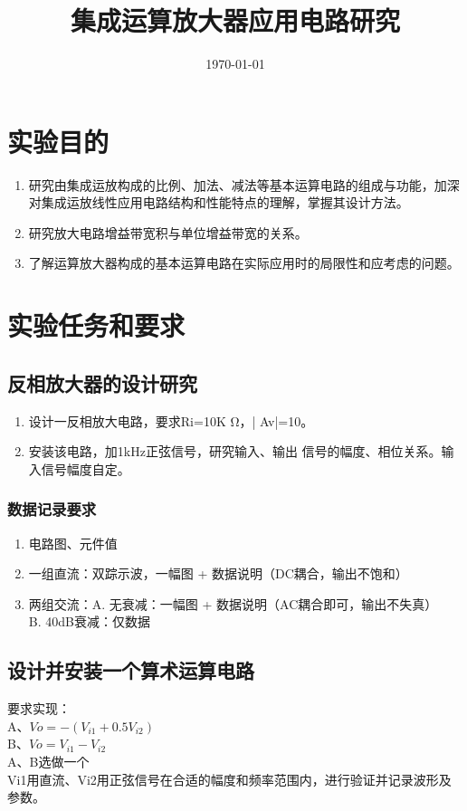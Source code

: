 \documentclass{../source/Experiment}
\title{集成运算放大器应用电路研究}
\date{\today}
\begin{document}
    \makecover
    \makeheader

    \section{实验目的}
        \begin{enumerate}
            \item 研究由集成运放构成的比例、加法、减法等基本运算电路的组成与功能，加深对集成运放线性应用电路结构和性能特点的理解，掌握其设计方法。
            \item 研究放大电路增益带宽积与单位增益带宽的关系。
            \item 了解运算放大器构成的基本运算电路在实际应用时的局限性和应考虑的问题。
        \end{enumerate}
    \section{实验任务和要求}
        \subsection{反相放大器的设计研究}
            \begin{enumerate}
                \item 设计一反相放大电路，要求Ri=10K Ω，| Av|=10。
                \item 安装该电路，加1kHz正弦信号，研究输入、输出	信号的幅度、相位关系。输入信号幅度自定。
            \end{enumerate}
            \subsubsection{数据记录要求}
                \begin{enumerate}
                    \item 电路图、元件值	
                    \item 一组直流：双踪示波，一幅图 + 数据说明（DC耦合，输出不饱和）
                    \item 两组交流：A. 无衰减：一幅图 + 数据说明（AC耦合即可，输出不失真）\\ B. 40dB衰减：仅数据
                \end{enumerate}
        \subsection{设计并安装一个算术运算电路}
                要求实现：\\
                A、$Vo = -(V_{i1}+0.5V_{i2})$ \\
                B、$Vo = V_{i1}-V_{i2}$ \\
                A、B选做一个 \\
                Vi1用直流、Vi2用正弦信号在合适的幅度和频率范围内，进行验证并记录波形及参数。
\end{document}
